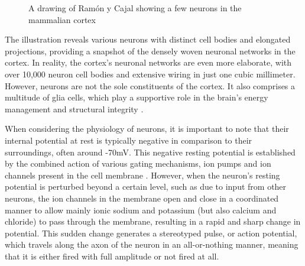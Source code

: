 \documentclass[12pt,a4paper]{report}
\begin{document}
\begin{figure}[H]
\centering %
\caption{A drawing of Ramón y Cajal showing  a few neurons in the mammalian cortex \cite{ref2}} 
\end{figure}

The illustration reveals various neurons with distinct cell bodies and elongated projections, providing a snapshot of the densely woven neuronal networks in the cortex. In reality, the cortex’s neuronal networks are even more elaborate, with over 10,000 neuron cell bodies and extensive wiring in just one cubic millimeter. However, neurons are not the sole constituents of the cortex. It also comprises a multitude of glia cells, which play a supportive role in the brain’s energy management and structural integrity \cite{ref2}. 

When considering the physiology of neurons, it is important to note that their internal potential at rest is typically negative in comparison to their surroundings, often around -70mV. This negative resting potential is established by the combined action of various gating mechanisms, ion pumps and ion channels present in the cell membrane \cite{ref3}. However, when the neuron's resting potential is perturbed beyond a certain level, such as due to input from other neurons, the ion channels in the membrane open and close in a coordinated manner to allow mainly ionic sodium and potassium (but also calcium and chloride) to pass through the membrane, resulting in a rapid and sharp change in potential. This sudden change generates a stereotyped pulse, or action potential, which travels along the axon of the neuron in an all-or-nothing manner, meaning that it is either fired with full amplitude or not fired at all.
\end{document}
